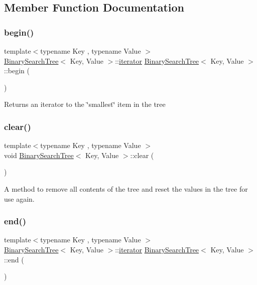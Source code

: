 \subsection{Member Function Documentation}
\mbox{\label{classBinarySearchTree_ac42b6e11e290cf9eaf56eba56ca56818}} 
\subsubsection{\texorpdfstring{begin()}{begin()}}
{\footnotesize\ttfamily template$<$typename Key , typename Value $>$ \\
\mbox{\hyperlink{classBinarySearchTree}{Binary\+Search\+Tree}}$<$ Key, Value $>$\+::\mbox{\hyperlink{classBinarySearchTree_1_1iterator}{iterator}} \mbox{\hyperlink{classBinarySearchTree}{Binary\+Search\+Tree}}$<$ Key, Value $>$\+::begin (\begin{DoxyParamCaption}{ }\end{DoxyParamCaption})}

Returns an iterator to the \char`\"{}smallest\char`\"{} item in the tree \mbox{\label{classBinarySearchTree_acce1030d8eb99522591b90e0824e7bbc}} 
\subsubsection{\texorpdfstring{clear()}{clear()}}
{\footnotesize\ttfamily template$<$typename Key , typename Value $>$ \\
void \mbox{\hyperlink{classBinarySearchTree}{Binary\+Search\+Tree}}$<$ Key, Value $>$\+::clear (\begin{DoxyParamCaption}{ }\end{DoxyParamCaption})}

A method to remove all contents of the tree and reset the values in the tree for use again. \mbox{\label{classBinarySearchTree_a6603b43057a4bf2843381b8abcb0d010}} 
\subsubsection{\texorpdfstring{end()}{end()}}
{\footnotesize\ttfamily template$<$typename Key , typename Value $>$ \\
\mbox{\hyperlink{classBinarySearchTree}{Binary\+Search\+Tree}}$<$ Key, Value $>$\+::\mbox{\hyperlink{classBinarySearchTree_1_1iterator}{iterator}} \mbox{\hyperlink{classBinarySearchTree}{Binary\+Search\+Tree}}$<$ Key, Value $>$\+::end (\begin{DoxyParamCaption}{ }\end{DoxyParamCaption})}

